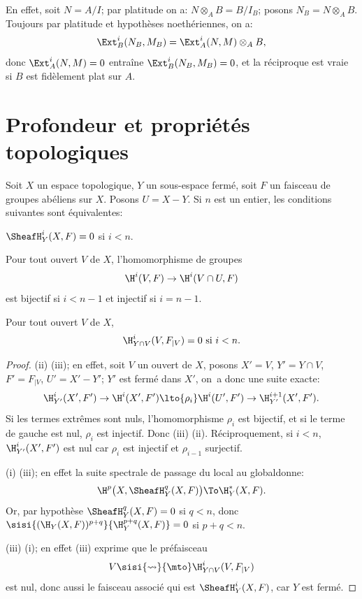 En effet, soit $N=A/I$; par platitude on a: $N\otimes_A B=B/I_B$; posons $N_B=N\otimes_A B$. Toujours par platitude et hypoth\`eses noeth\'eriennes, on a:
\[
\Ext_B^i (N_B, M_B) = \Ext_A^i(N, M)\otimes_A B,
\]
donc $\Ext_A^i(N, M) = 0 $ entra\^ine $\Ext_B^i(N_B, M_B)=0$, et la r\'eciproque est vraie si $B$ est fid\`element plat sur $A$.

\section{Profondeur et propri\'et\'es topologiques} \label{III.3}

\begin{lemme} \label{III.3.1}
Soit $X$ un espace topologique, $Y$ un sous-espace ferm\'e, soit $F$ un faisceau de groupes ab\'eliens sur $X$. Posons $U=X- Y$. Si $n$ est un entier, les conditions suivantes sont \'equivalentes:
\begin{enumeratei}
\item
$\SheafH_Y^i (X, F)=0$ si $i<n$.\pageoriginale
\item
Pour tout ouvert $V$ de $X$, l'homomorphisme de groupes
\[
\H^i(V, F) \to \H^i(V\cap U, F)
\]
est bijectif si $i<n-1$ et injectif si $i=n-1$.

\item
Pour tout ouvert $V$ de $X$,
\[
\H_{Y\cap V}^i(V, F_{\mid V})=0 \text{ si } i<n.
\]
\end{enumeratei}
\end{lemme}

\skpt

\begin{proof}
(ii) \SSI (iii); en effet, soit $V$ un ouvert de $X$, posons $X'=V$, $Y'=Y\cap V$, $F'=F_{\mid V}$, $U'=X'- Y'$; $Y'$ est ferm\'e dans $X'$, on~a donc une suite exacte:
\[
\H_{Y'}^i(X', F') \to \H^i(X', F') \lto{\rho_i} \H^i(U', F') \to \H_{Y'}^{i+1}(X', F').
\]
Si les termes extr\^emes sont nuls, l'homomorphisme $\rho_i$ est bijectif, et si le terme de gauche est nul, $\rho_i$ est injectif. Donc (iii) \ALORS (ii). R\'eciproquement, si $i<n$, $\H_{Y'}^i(X', F')$ est nul car $\rho_i$ est injectif et $\rho_{i-1}$ surjectif.

(i) \ALORS (iii); en effet la suite spectrale \og de passage du local au global\fg donne:
\[
\H^p\bigl(X, \SheafH_Y^q(X, F)\bigr) \To \H_Y^*(X, F).
\]
Or, par hypoth\`ese $\SheafH_Y^q(X, F) =0$ si $q<n$, donc $\sisi{(\H_Y (X, F))^{p+q}}{\H_Y^{p+q} (X, F)} = 0$ si $p+q<n$.

(iii) \ALORS (i); en effet (iii) exprime que le pr\'efaisceau
\[
V \sisi{\rightsquigarrow}{\mto} \H_{Y\cap V}^i(V, F_{\mid V})
\]
est nul, donc aussi le faisceau associ\'e qui est $\SheafH_Y^i (X, F)$, car $Y$ est ferm\'e.
\skipqed
\end{proof}

